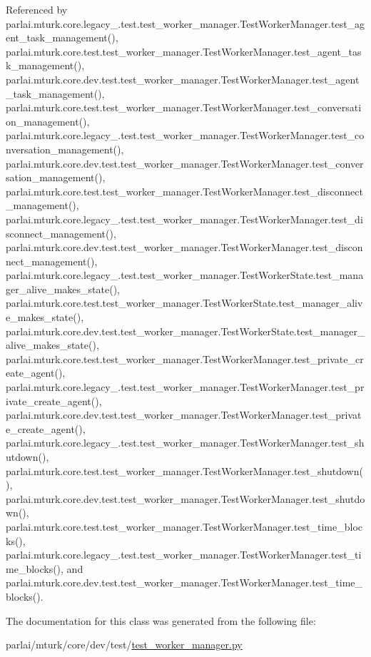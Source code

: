 Referenced by parlai.\+mturk.\+core.\+legacy\+\_.\+test.\+test\+\_\+worker\+\_\+manager.\+Test\+Worker\+Manager.\+test\+\_\+agent\+\_\+task\+\_\+management(), parlai.\+mturk.\+core.\+test.\+test\+\_\+worker\+\_\+manager.\+Test\+Worker\+Manager.\+test\+\_\+agent\+\_\+task\+\_\+management(), parlai.\+mturk.\+core.\+dev.\+test.\+test\+\_\+worker\+\_\+manager.\+Test\+Worker\+Manager.\+test\+\_\+agent\+\_\+task\+\_\+management(), parlai.\+mturk.\+core.\+test.\+test\+\_\+worker\+\_\+manager.\+Test\+Worker\+Manager.\+test\+\_\+conversation\+\_\+management(), parlai.\+mturk.\+core.\+legacy\+\_.\+test.\+test\+\_\+worker\+\_\+manager.\+Test\+Worker\+Manager.\+test\+\_\+conversation\+\_\+management(), parlai.\+mturk.\+core.\+dev.\+test.\+test\+\_\+worker\+\_\+manager.\+Test\+Worker\+Manager.\+test\+\_\+conversation\+\_\+management(), parlai.\+mturk.\+core.\+test.\+test\+\_\+worker\+\_\+manager.\+Test\+Worker\+Manager.\+test\+\_\+disconnect\+\_\+management(), parlai.\+mturk.\+core.\+legacy\+\_.\+test.\+test\+\_\+worker\+\_\+manager.\+Test\+Worker\+Manager.\+test\+\_\+disconnect\+\_\+management(), parlai.\+mturk.\+core.\+dev.\+test.\+test\+\_\+worker\+\_\+manager.\+Test\+Worker\+Manager.\+test\+\_\+disconnect\+\_\+management(), parlai.\+mturk.\+core.\+legacy\+\_.\+test.\+test\+\_\+worker\+\_\+manager.\+Test\+Worker\+State.\+test\+\_\+manager\+\_\+alive\+\_\+makes\+\_\+state(), parlai.\+mturk.\+core.\+test.\+test\+\_\+worker\+\_\+manager.\+Test\+Worker\+State.\+test\+\_\+manager\+\_\+alive\+\_\+makes\+\_\+state(), parlai.\+mturk.\+core.\+dev.\+test.\+test\+\_\+worker\+\_\+manager.\+Test\+Worker\+State.\+test\+\_\+manager\+\_\+alive\+\_\+makes\+\_\+state(), parlai.\+mturk.\+core.\+test.\+test\+\_\+worker\+\_\+manager.\+Test\+Worker\+Manager.\+test\+\_\+private\+\_\+create\+\_\+agent(), parlai.\+mturk.\+core.\+legacy\+\_.\+test.\+test\+\_\+worker\+\_\+manager.\+Test\+Worker\+Manager.\+test\+\_\+private\+\_\+create\+\_\+agent(), parlai.\+mturk.\+core.\+dev.\+test.\+test\+\_\+worker\+\_\+manager.\+Test\+Worker\+Manager.\+test\+\_\+private\+\_\+create\+\_\+agent(), parlai.\+mturk.\+core.\+legacy\+\_.\+test.\+test\+\_\+worker\+\_\+manager.\+Test\+Worker\+Manager.\+test\+\_\+shutdown(), parlai.\+mturk.\+core.\+test.\+test\+\_\+worker\+\_\+manager.\+Test\+Worker\+Manager.\+test\+\_\+shutdown(), parlai.\+mturk.\+core.\+dev.\+test.\+test\+\_\+worker\+\_\+manager.\+Test\+Worker\+Manager.\+test\+\_\+shutdown(), parlai.\+mturk.\+core.\+test.\+test\+\_\+worker\+\_\+manager.\+Test\+Worker\+Manager.\+test\+\_\+time\+\_\+blocks(), parlai.\+mturk.\+core.\+legacy\+\_.\+test.\+test\+\_\+worker\+\_\+manager.\+Test\+Worker\+Manager.\+test\+\_\+time\+\_\+blocks(), and parlai.\+mturk.\+core.\+dev.\+test.\+test\+\_\+worker\+\_\+manager.\+Test\+Worker\+Manager.\+test\+\_\+time\+\_\+blocks().



The documentation for this class was generated from the following file\+:\begin{DoxyCompactItemize}
\item 
parlai/mturk/core/dev/test/\hyperlink{dev_2test_2test__worker__manager_8py}{test\+\_\+worker\+\_\+manager.\+py}\end{DoxyCompactItemize}
